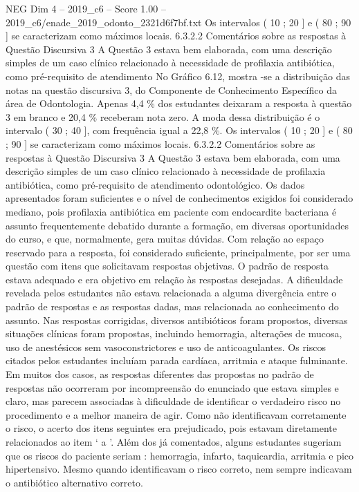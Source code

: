 \begin{textsample}{NEG Dim 4 – 2019\_c6 – Score 1.00 – 2019\_c6/enade\_2019\_odonto\_2321d6f7bf.txt}
Os intervalos ( 10 ; 20 ] e ( 80 ; 90 ] se caracterizam como máximos locais. 6.3.2.2 Comentários sobre as respostas à Questão Discursiva 3 A Questão 3 estava bem elaborada, com uma descrição simples de um caso clínico relacionado à necessidade de profilaxia antibiótica, como pré-requisito de atendimento No Gráfico 6.12, mostra -se a distribuição das notas na questão discursiva 3, do Componente de Conhecimento Específico da área de Odontologia.
Apenas 4,4 \% dos estudantes deixaram a resposta à questão 3 em branco e 20,4 \% receberam nota zero.
A moda dessa distribuição é o intervalo ( 30 ; 40 ], com frequência igual a 22,8 \%.
Os intervalos ( 10 ; 20 ] e ( 80 ; 90 ] se caracterizam como máximos locais. 6.3.2.2 Comentários sobre as respostas à Questão Discursiva 3 A Questão 3 estava bem elaborada, com uma descrição simples de um caso clínico relacionado à necessidade de profilaxia antibiótica, como pré-requisito de atendimento odontológico.
Os dados apresentados foram suficientes e o nível de conhecimentos exigidos foi considerado mediano, pois profilaxia antibiótica em paciente com endocardite bacteriana é assunto frequentemente debatido durante a formação, em diversas oportunidades do curso, e que, normalmente, gera muitas dúvidas.
Com relação ao espaço reservado para a resposta, foi considerado suficiente, principalmente, por ser uma questão com itens que solicitavam respostas objetivas.
O padrão de resposta estava adequado e era objetivo em relação às respostas desejadas.
A dificuldade revelada pelos estudantes não estava relacionada a alguma divergência entre o padrão de respostas e as respostas dadas, mas relacionada ao conhecimento do assunto.
Nas respostas corrigidas, diversos antibióticos foram propostos, diversas situações clínicas foram propostas, incluindo hemorragia, alterações de mucosa, uso de anestésicos sem vasoconstrictores e uso de anticoagulantes.
Os riscos citados pelos estudantes incluíam parada cardíaca, arritmia e ataque fulminante.
Em muitos dos casos, as respostas diferentes das propostas no padrão de respostas não ocorreram por incompreensão do enunciado que estava simples e claro, mas parecem associadas à dificuldade de identificar o verdadeiro risco no procedimento e a melhor maneira de agir.
Como não identificavam corretamente o risco, o acerto dos itens seguintes era prejudicado, pois estavam diretamente relacionados ao item ‘ a ’.
Além dos já comentados, alguns estudantes sugeriam que os riscos do paciente seriam : hemorragia, infarto, taquicardia, arritmia e pico hipertensivo.
Mesmo quando identificavam o risco correto, nem sempre indicavam o antibiótico alternativo correto.

\end{textsample}
